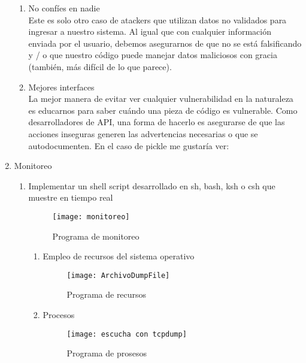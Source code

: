 \documentclass[a4paperx]{article}
\begin{document}
\begin{enumerate}
\begin{enumerate}
\item{No confíes en nadie}\\

Este es solo otro caso de atackers que utilizan datos no validados para ingresar a nuestro sistema. Al igual que con cualquier información enviada por el usuario, debemos asegurarnos de que no se está falsificando y / o que nuestro código puede manejar datos maliciosos con gracia (también, más difícil de lo que parece).\\

\item{Mejores interfaces}\\

La mejor manera de evitar ver cualquier vulnerabilidad en la naturaleza es educarnos para saber cuándo una pieza de código es vulnerable. Como desarrolladores de API, una forma de hacerlo es asegurarse de que las acciones inseguras generen las advertencias necesarias o que se autodocumenten. En el caso de pickle me gustaría ver:

\end{enumerate}

\item{Monitoreo}\\

\begin{enumerate}

\item{Implementar un shell script desarrollado en sh, bash, ksh o csh que muestre en tiempo real}\\

\begin{figure}[H]
\centering
\texttt{[image: monitoreo]}
\caption{Programa de monitoreo}
\end{figure}

\begin{enumerate}

\item{Empleo de recursos del sistema operativo}\\

\begin{figure}[H]
\centering
\texttt{[image: ArchivoDumpFile]}
\caption{Programa de recursos}
\end{figure}

\item{Procesos}\\

\begin{figure}[H]
\centering
\texttt{[image: escucha con tcpdump]}
\caption{Programa de prosesos}
\end{figure}



\end{enumerate}
\end{enumerate}
\end{enumerate}
\end{document}
